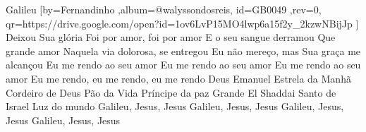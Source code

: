 \beginsong
{Galileu %
}[by={Fernandinho %
},album={@walyssondosreis},
id={GB0049 %
},rev={0}, %
qr={https://drive.google.com/open?id=1ov6LvP15MO4lwp6a15f2y_2kzwNBijJp %
}]
\beginverse*
Deixou Sua glória
Foi por amor, foi por amor
E o seu sangue derramou
Que grande amor
\endverse
\beginverse*
Naquela via dolorosa, se entregou
Eu não mereço, mas Sua graça me alcançou
\endverse
\beginverse*
Eu me rendo ao seu amor
Eu me rendo ao seu amor
Eu me rendo ao seu amor
Eu me rendo, eu me rendo, eu me rendo
\endverse
\beginverse*
Deus Emanuel
Estrela da Manhã
Cordeiro de Deus
Pão da Vida
Príncipe da paz
Grande El Shaddai
Santo de Israel
Luz do mundo
\endverse
\beginchorus
Galileu, Jesus, Jesus
Galileu, Jesus, Jesus
Galileu, Jesus, Jesus
Galileu, Jesus, Jesus
\endchorus

